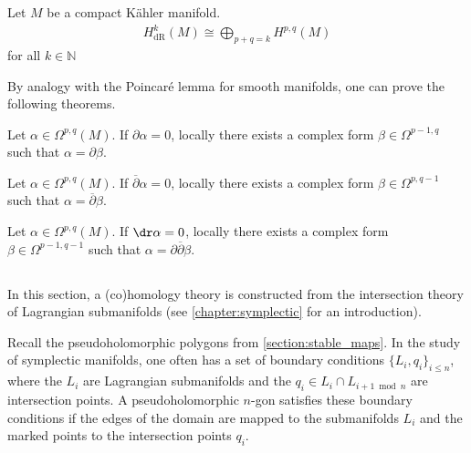    \begin{theorem}
        Let $M$ be a compact K\"ahler manifold.
        \begin{gather}
            H^k_\text{dR}(M)\cong\bigoplus_{p+q=k}H^{p,q}(M)
        \end{gather}
        for all $k\in\mathbb{N}$
    \end{theorem}

    By analogy with the Poincar\'e lemma for smooth manifolds, one can prove the following theorems.
    \begin{theorem}
        Let $\alpha\in\Omega^{p,q}(M)$. If $\partial\alpha = 0$, locally there exists a complex form $\beta\in\Omega^{p-1,q}$ such that $\alpha = \partial\beta$.
    \end{theorem}
    \begin{theorem}
        Let $\alpha\in\Omega^{p,q}(M)$. If $\overline{\partial}\alpha = 0$, locally there exists a complex form $\beta\in\Omega^{p,q-1}$ such that $\alpha = \overline{\partial}\beta$.
    \end{theorem}
    \begin{theorem}\label{complex:del_delbar_lemma}
        Let $\alpha\in\Omega^{p,q}(M)$. If $\dr\alpha = 0$, locally there exists a complex form $\beta\in\Omega^{p-1,q-1}$ such that $\alpha = \partial\overline{\partial}\beta$.
    \end{theorem}

\subsection{}

    In this section, a (co)homology theory is constructed from the intersection theory of Lagrangian submanifolds (see \cref{chapter:symplectic} for an introduction).

    Recall the pseudoholomorphic polygons from \cref{section:stable_maps}. In the study of symplectic manifolds, one often has a set of boundary conditions $\{L_i,q_i\}_{i\leq n}$, where the $L_i$ are Lagrangian submanifolds and the $q_i\in L_i\cap L_{i+1\bmod n}$ are intersection points. A pseudoholomorphic $n$-gon satisfies these boundary conditions if the edges of the domain are mapped to the submanifolds $L_i$ and the marked points to the intersection points $q_i$.

